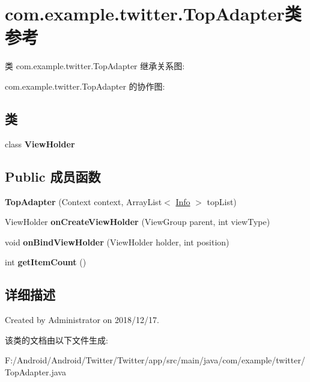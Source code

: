 \hypertarget{classcom_1_1example_1_1twitter_1_1_top_adapter}{}\section{com.\+example.\+twitter.\+Top\+Adapter类 参考}
\label{classcom_1_1example_1_1twitter_1_1_top_adapter}


类 com.\+example.\+twitter.\+Top\+Adapter 继承关系图\+:


com.\+example.\+twitter.\+Top\+Adapter 的协作图\+:
\subsection*{类}
\begin{DoxyCompactItemize}
\item 
class {\bfseries View\+Holder}
\end{DoxyCompactItemize}
\subsection*{Public 成员函数}
\begin{DoxyCompactItemize}
\item 
\mbox{\label{classcom_1_1example_1_1twitter_1_1_top_adapter_a9c4368180dd169a35a7887fc9908d351}} 
{\bfseries Top\+Adapter} (Context context, Array\+List$<$ \mbox{\hyperlink{classcom_1_1example_1_1twitter_1_1_info}{Info}} $>$ top\+List)
\item 
\mbox{\label{classcom_1_1example_1_1twitter_1_1_top_adapter_a7e16bf0a3d9c215493e38b50d0c6f5c5}} 
View\+Holder {\bfseries on\+Create\+View\+Holder} (View\+Group parent, int view\+Type)
\item 
\mbox{\label{classcom_1_1example_1_1twitter_1_1_top_adapter_aebd487d358de893159101d5b10b17b27}} 
void {\bfseries on\+Bind\+View\+Holder} (View\+Holder holder, int position)
\item 
\mbox{\label{classcom_1_1example_1_1twitter_1_1_top_adapter_a21dc90f20424d4e16cd373db5d45d0c8}} 
int {\bfseries get\+Item\+Count} ()
\end{DoxyCompactItemize}


\subsection{详细描述}
Created by Administrator on 2018/12/17. 

该类的文档由以下文件生成\+:\begin{DoxyCompactItemize}
\item 
F\+:/\+Android/\+Android/\+Twitter/\+Twitter/app/src/main/java/com/example/twitter/Top\+Adapter.\+java\end{DoxyCompactItemize}

